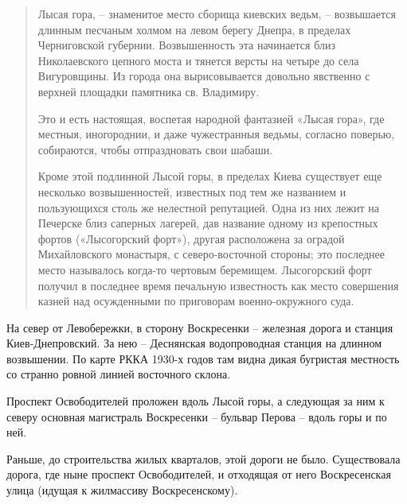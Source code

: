 \begin{quotation}
Лысая гора, – знаменитое место  сборища киевских ведьм, – возвышается длинным песчаным холмом на левом берегу Днепра, в пределах Черниговской губернии. Возвышенность эта начинается близ Николаевского цепного моста и тянется версты на четыре до села Вигуровщины. Из города она вырисовывается довольно явственно с верхней площадки памятника св. Владимиру. 

Это и есть настоящая, воспетая народной фантазией «Лысая гора», где местныя, иногороднии, и даже чужестранныя ведьмы, согласно поверью, собираются, чтобы отпраздновать свои шабаши. 

Кроме этой подлинной Лысой горы, в пределах Киева существует еще несколько возвышенностей, известных под тем же названием и пользующихся столь же нелестной репутацией. Одна из них лежит на Печерске близ саперных лагерей, дав название одному из крепостных фортов («Лысогорский форт»), другая расположена за оградой Михайловского монастыря, с северо-восточной стороны; это последнее место называлось когда-то чертовым беремищем. Лысогорский форт получил в последнее время печальную известность как место совершения казней над осужденными по приговорам военно-окружного суда.
\end{quotation}


На север от Левобережки, в сторону Воскресенки – железная дорога и станция Киев-Днепровский. За нею – Деснянская водопроводная станция на длинном возвышении. По карте РККА 1930-х годов там видна дикая бугристая местность со странно ровной линией восточного склона.

Проспект Освободителей проложен вдоль Лысой горы, а следующая за ним к северу основная магистраль Воскресенки – бульвар Перова – вдоль горы и по ней. 

Раньше, до строительства жилых кварталов, этой дороги не было. Существовала дорога, где ныне проспект Освободителей, и отходящая от него Воскресенская улица (идущая к жилмассиву Воскресенскому).

